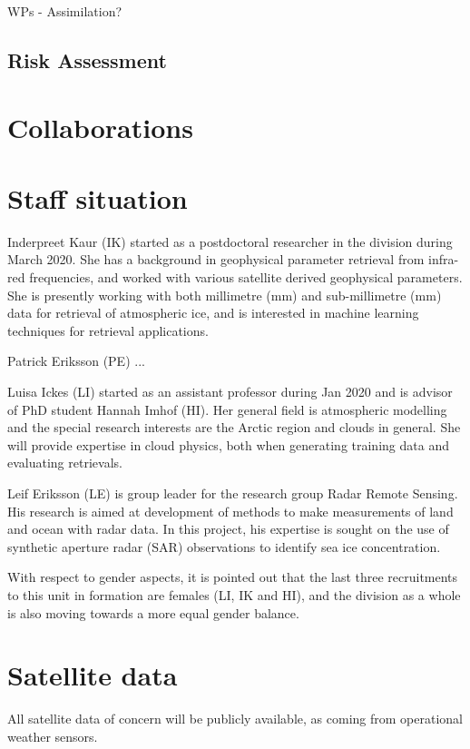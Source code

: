 \documentclass[12pt,oneside,a4paper]{article}
\begin{document}
WPs  - Assimilation?

\subsection{Risk Assessment}

\section{Collaborations}

\section{Staff situation}
\label{sec:staff}
%
Inderpreet Kaur (IK) started as a postdoctoral researcher in the division during March 2020. She has a background in geophysical parameter retrieval from infra-red frequencies, and worked with various satellite derived geophysical parameters. She is presently working with both millimetre (mm) and sub-millimetre (mm) data for retrieval of atmospheric ice, and is interested in machine learning techniques for retrieval applications. 

Patrick Eriksson (PE) ...

Luisa Ickes (LI) started as an assistant professor during Jan 2020 and is advisor of PhD student Hannah Imhof (HI). Her general field is atmospheric modelling and the special research interests are the Arctic region and clouds in general. She will provide expertise in cloud physics, both when generating training data and evaluating retrievals.

Leif Eriksson (LE) is group leader for the research group Radar Remote Sensing. His research is aimed at development of methods to make measurements of land and ocean with radar data. In this project, his expertise is sought on the use of synthetic aperture radar (SAR) observations to identify sea ice concentration.

With respect to gender aspects, it is pointed out that the last three recruitments to this unit in formation are females (LI, IK and  HI), and the division as a whole is also moving towards a more equal gender balance. 

\section{Satellite data}
%
All satellite data of concern will be publicly available, as coming from
operational weather sensors.

{\footnotesize
	
}
\end{document}
